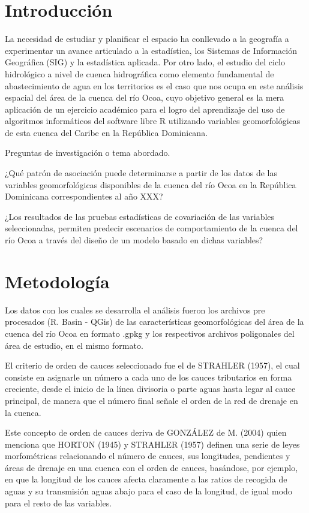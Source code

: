 \documentclass[11pt,]{article}
\begin{document}
\vskip 6.5pt


\noindent  \section{Introducción}\label{introducciuxf3n}

La necesidad de estudiar y planificar el espacio ha conllevado a la
geografía a experimentar un avance articulado a la estadística, los
Sistemas de Información Geográfica (SIG) y la estadística aplicada. Por
otro lado, el estudio del ciclo hidrológico a nivel de cuenca
hidrográfica como elemento fundamental de abastecimiento de agua en los
territorios es el caso que nos ocupa en este análisis espacial del área
de la cuenca del río Ocoa, cuyo objetivo general es la mera aplicación
de un ejercicio académico para el logro del aprendizaje del uso de
algoritmos informáticos del software libre R utilizando variables
geomorfológicas de esta cuenca del Caribe en la República Dominicana.

Preguntas de investigación o tema abordado.

¿Qué patrón de asociación puede determinarse a partir de los datos de
las variables geomorfológicas disponibles de la cuenca del río Ocoa en
la República Dominicana correspondientes al año XXX?

¿Los resultados de las pruebas estadísticas de covariación de las
variables seleccionadas, permiten predecir escenarios de comportamiento
de la cuenca del río Ocoa a través del diseño de un modelo basado en
dichas variables?

\section{Metodología}\label{metodologuxeda}

Los datos con los cuales se desarrolla el análisis fueron los archivos
pre procesados (R. Basin - QGis) de las características geomorfológicas
del área de la cuenca del río Ocoa en formato .gpkg y los respectivos
archivos poligonales del área de estudio, en el mismo formato.

El criterio de orden de cauces seleccionado fue el de STRAHLER (1957),
el cual consiste en asignarle un número a cada uno de los cauces
tributarios en forma creciente, desde el inicio de la línea divisoria o
parte aguas hasta legar al cauce principal, de manera que el número
final señale el orden de la red de drenaje en la cuenca.

Este concepto de orden de cauces deriva de GONZÁLEZ de M. (2004) quien
menciona que HORTON (1945) y STRAHLER (1957) definen una serie de leyes
morfométricas relacionando el número de cauces, sus longitudes,
pendientes y áreas de drenaje en una cuenca con el orden de cauces,
basándose, por ejemplo, en que la longitud de los cauces afecta
claramente a las ratios de recogida de aguas y su transmisión aguas
abajo para el caso de la longitud, de igual modo para el resto de las
variables.
\end{document}
